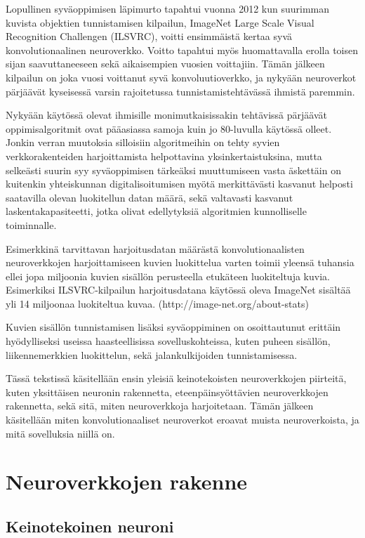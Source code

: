 \documentclass[finnish]{tktltiki2}
\theoremstyle{definition}
\theoremstyle{remark}
\begin{document}
  Lopullinen syväoppimisen läpimurto tapahtui vuonna 2012 kun suurimman kuvista objektien tunnistamisen kilpailun, ImageNet Large Scale Visual Recognition Challengen (ILSVRC), voitti ensimmäistä kertaa syvä konvolutionaalinen neuroverkko. Voitto tapahtui myös huomattavalla erolla toisen sijan saavuttaneeseen sekä aikaisempien vuosien voittajiin. Tämän jälkeen kilpailun on joka vuosi voittanut syvä konvoluutioverkko, ja nykyään neuroverkot pärjäävät kyseisessä varsin rajoitetussa tunnistamistehtävässä ihmistä paremmin.

  Nykyään käytössä olevat ihmisille monimutkaisissakin tehtävissä pärjäävät oppimisalgoritmit ovat pääasiassa samoja kuin jo 80-luvulla käytössä olleet. Jonkin verran muutoksia silloisiin algoritmeihin on tehty syvien verkkorakenteiden harjoittamista helpottavina yksinkertaistuksina, mutta selkeästi suurin syy syväoppimisen tärkeäksi muuttumiseen vasta äskettäin on kuitenkin yhteiskunnan digitalisoitumisen myötä merkittävästi kasvanut helposti saatavilla olevan luokitellun datan määrä, sekä valtavasti kasvanut laskentakapasiteetti, jotka olivat edellytyksiä algoritmien kunnolliselle toiminnalle.

  Esimerkkinä tarvittavan harjoitusdatan määrästä konvolutionaalisten neuroverkkojen harjoittamiseen kuvien luokittelua varten toimii yleensä tuhansia ellei jopa miljoonia kuvien sisällön perusteella etukäteen luokiteltuja kuvia. Esimerkiksi ILSVRC-kilpailun harjoitusdatana käytössä oleva ImageNet sisältää yli 14 miljoonaa luokiteltua kuvaa. (http://image-net.org/about-stats)

  Kuvien sisällön tunnistamisen lisäksi syväoppiminen on osoittautunut erittäin hyödylliseksi useissa haasteellisissa sovelluskohteissa, kuten puheen sisällön, liikennemerkkien luokittelun, sekä jalankulkijoiden tunnistamisessa.

  Tässä tekstissä käsitellään ensin yleisiä keinotekoisten neuroverkkojen piirteitä, kuten yksittäisen neuronin rakennetta, eteenpäinsyöttävien neuroverkkojen rakennetta, sekä sitä, miten neuroverkkoja harjoitetaan. Tämän jälkeen käsitellään miten konvolutionaaliset neuroverkot eroavat muista neuroverkoista, ja mitä sovelluksia niillä on.

  \section{Neuroverkkojen rakenne}
  \subsection{Keinotekoinen neuroni}
    \label{chap:artificial-neuron}
\end{document}
